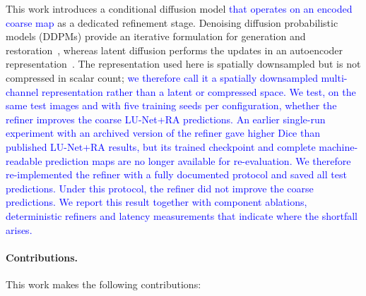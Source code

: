 \documentclass[jimaging,article,submit,pdftex,moreauthors]
  {Definitions/mdpi}
\DeclareRobustCommand{\rev}[1]{\textcolor{blue}{#1}}
\DeclareRobustCommand{\rev}[1]{#1}
\providecommand{\linelabel}[1]{}
\begin{document}
This work introduces a conditional diffusion model \rev{that operates on an encoded coarse map} as a dedicated refinement stage. Denoising diffusion probabilistic models (DDPMs) provide an iterative formulation for generation and restoration~\cite{Ho2020,Dhariwal2021}, whereas latent diffusion performs the updates in an autoencoder representation~\cite{Rombach2022}. The representation used here is spatially downsampled but is not compressed in scalar count; \rev{we therefore call it a spatially downsampled multi-channel representation rather than a latent or compressed space. We test, on the same test images and with five training seeds per configuration, whether the refiner improves the coarse LU-Net+RA predictions. An earlier single-run experiment with an archived version of the refiner gave higher Dice than published LU-Net+RA results, but its trained checkpoint and complete machine-readable prediction maps are no longer available for re-evaluation. We therefore re-implemented the refiner with a fully documented protocol and saved all test predictions. Under this protocol, the refiner did not improve the coarse predictions. We report this result together with component ablations, deterministic refiners and latency measurements that indicate where the shortfall arises.}\linelabel{rev:intro:representation}

\paragraph{Contributions.}
This work makes the following contributions:
\end{document}
